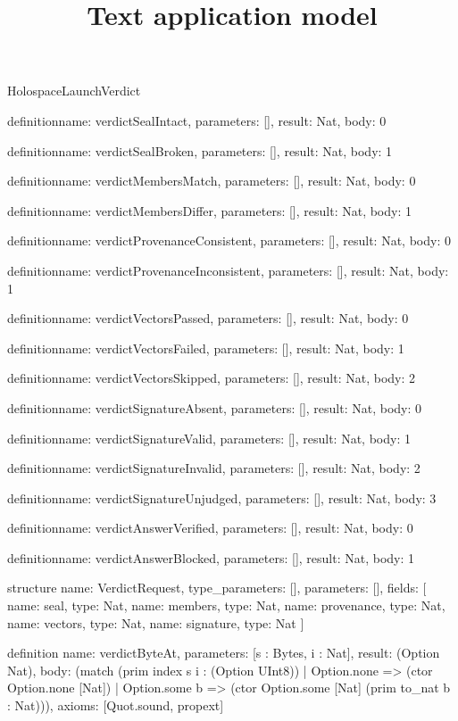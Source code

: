 \begin{lexlean}{HolospaceLaunchVerdict}
\title{Text application model}
\begin{semanticmodule}
definition{name: verdictSealIntact, parameters: [], result: Nat, body: 0}

definition{name: verdictSealBroken, parameters: [], result: Nat, body: 1}

definition{name: verdictMembersMatch, parameters: [], result: Nat, body: 0}

definition{name: verdictMembersDiffer, parameters: [], result: Nat, body: 1}

definition{name: verdictProvenanceConsistent, parameters: [], result: Nat, body: 0}

definition{name: verdictProvenanceInconsistent, parameters: [], result: Nat, body: 1}

definition{name: verdictVectorsPassed, parameters: [], result: Nat, body: 0}

definition{name: verdictVectorsFailed, parameters: [], result: Nat, body: 1}

definition{name: verdictVectorsSkipped, parameters: [], result: Nat, body: 2}

definition{name: verdictSignatureAbsent, parameters: [], result: Nat, body: 0}

definition{name: verdictSignatureValid, parameters: [], result: Nat, body: 1}

definition{name: verdictSignatureInvalid, parameters: [], result: Nat, body: 2}

definition{name: verdictSignatureUnjudged, parameters: [], result: Nat, body: 3}

definition{name: verdictAnswerVerified, parameters: [], result: Nat, body: 0}

definition{name: verdictAnswerBlocked, parameters: [], result: Nat, body: 1}

structure{
  name: VerdictRequest,
  type_parameters: [],
  parameters: [],
  fields: [
    {name: seal, type: Nat},
    {name: members, type: Nat},
    {name: provenance, type: Nat},
    {name: vectors, type: Nat},
    {name: signature, type: Nat}
  ]
}

definition{
  name: verdictByteAt,
  parameters: [s : Bytes, i : Nat],
  result: (Option Nat),
  body: (match (prim index s i : (Option UInt8))
    | Option.none => (ctor Option.none [Nat])
    | Option.some b => (ctor Option.some [Nat] (prim to_nat b : Nat))),
  axioms: [Quot.sound, propext]
}


\end{semanticmodule}
\end{lexlean}
